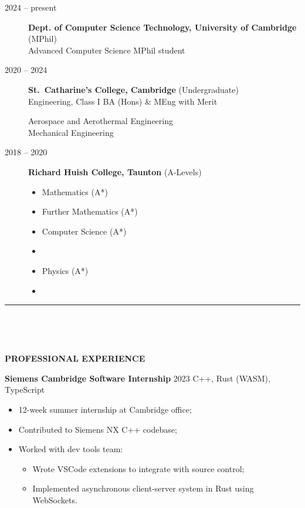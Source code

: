 \documentclass[
  11pt,
  a4paper,
]{article}
\providecommand{\tightlist}{%
  \setlength{\itemsep}{0pt}\setlength{\parskip}{0pt}}
\newcommand{\itemspace}{0.8ex}
\newcommand{\ruledheader}[2]{%
\begingroup
\setlength{\fboxsep}{0pt}%
\colorbox{#1}{%
\parbox[b][1.2ex][t]{35mm}{\begin{tiny}\ \end{tiny}}}%
\parbox[b][1.2ex][t]{5mm}{\begin{tiny}\ \end{tiny}}%
\uppercase{\textbf{#2}}
\endgroup}
\begin{document}
\begin{description}
\item[2024 – present]
\textbf{Dept. of Computer Science Technology, University of Cambridge}
(MPhil)\\
Advanced Computer Science MPhil student
\item[2020 – 2024]
\textbf{St.~Catharine’s College, Cambridge} (Undergraduate)\\
Engineering, Class I BA (Hons) \& MEng with Merit

Aerospace and Aerothermal Engineering\\
Mechanical Engineering
\item[2018 – 2020]
\textbf{Richard Huish College, Taunton} (A-Levels)

\begingroup
\begin{multicols}{3}

\begin{itemize}
\tightlist
\item
  Mathematics (A*)
\item
  Further Mathematics (A*)
\item
  Computer Science (A*)
\item
\item
  Physics (A*)
\item
\end{itemize}

\end{multicols}
\vspace{-\parskip}\endgroup
\end{description}

\begin{Large}

\vspace{-1.5ex}\rule{\textwidth}{0.8pt}\vspace{2ex}

\ruledheader{cyan!50!teal}{Professional experience}\end{Large}

\vspace{\itemspace}

\textbf{Siemens Cambridge Software Internship} \textbar{} 2023
\textbar{} C++, Rust (WASM), TypeScript

\begin{itemize}
\tightlist
\item
  12-week summer internship at Cambridge office;
\item
  Contributed to Siemens NX C++ codebase;
\item
  Worked with dev tools team:

  \begin{itemize}
  \tightlist
  \item
    Wrote VSCode extensions to integrate with source control;
  \item
    Implemented asynchronous client-server system in Rust using
    WebSockets.
  \end{itemize}
\end{itemize}
\end{document}
